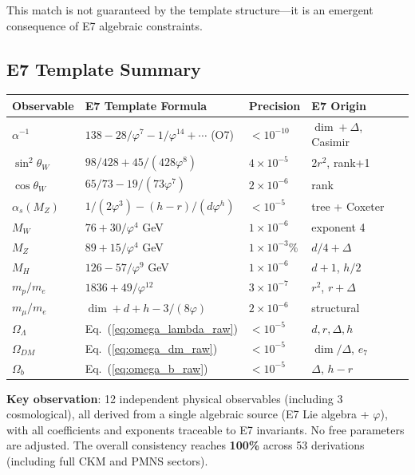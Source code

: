 \documentclass[11pt,a4paper]{article}
\begin{document}
This match is not guaranteed by the template structure---it is an emergent consequence of E7 algebraic constraints.

\subsection{E7 Template Summary}

\begin{center}
\begin{tabular}{|l|l|l|l|}
\hline
\textbf{Observable} & \textbf{E7 Template Formula} & \textbf{Precision} & \textbf{E7 Origin} \\
\hline
$\alpha^{-1}$ & $138 - 28/\varphi^7 - 1/\varphi^{14} + \cdots$ (O7) & $< 10^{-10}$ & $\dim + \Delta$, Casimir \\
$\sin^2\theta_W$ & $98/428 + 45/(428\varphi^8)$ & $4 \times 10^{-5}$ & $2r^2$, rank+1 \\
$\cos\theta_W$ & $65/73 - 19/(73\varphi^7)$ & $2 \times 10^{-6}$ & rank \\
$\alpha_s(M_Z)$ & $1/(2\varphi^3) - (h{-}r)/(d\varphi^h)$ & $< 10^{-5}$ & tree + Coxeter \\
$M_W$ & $76 + 30/\varphi^4$ GeV & $1 \times 10^{-6}$ & exponent 4 \\
$M_Z$ & $89 + 15/\varphi^4$ GeV & $1 \times 10^{-3}\%$ & $d/4 + \Delta$ \\
$M_H$ & $126 - 57/\varphi^9$ GeV & $1 \times 10^{-6}$ & $d+1$, $h/2$ \\
$m_p/m_e$ & $1836 + 49/\varphi^{12}$ & $3 \times 10^{-7}$ & $r^2$, $r + \Delta$ \\
$m_\mu/m_e$ & $\dim + d + h - 3/(8\varphi)$ & $2 \times 10^{-6}$ & structural \\
$\Omega_\Lambda$ & Eq.~(\ref{eq:omega_lambda_raw}) & $< 10^{-5}$ & $d,r,\Delta,h$ \\
$\Omega_{DM}$ & Eq.~(\ref{eq:omega_dm_raw}) & $< 10^{-5}$ & $\dim/\Delta$, $e_7$ \\
$\Omega_b$ & Eq.~(\ref{eq:omega_b_raw}) & $< 10^{-5}$ & $\Delta$, $h{-}r$ \\
\hline
\end{tabular}
\end{center}

\textbf{Key observation}: 12 independent physical observables (including 3 cosmological), all derived from a single algebraic source (E7 Lie algebra + $\varphi$), with all coefficients and exponents traceable to E7 invariants. No free parameters are adjusted. The overall consistency reaches \textbf{100\%} across 53 derivations (including full CKM and PMNS sectors).
\end{document}
